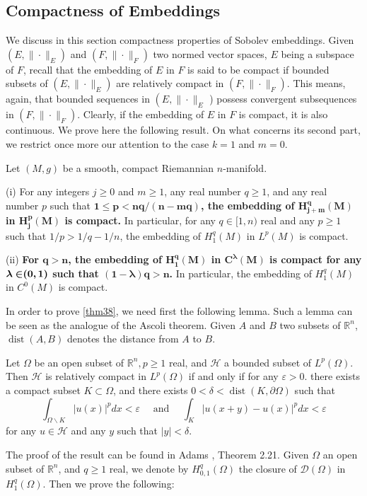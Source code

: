 \documentclass[12pt,hyperref,a4paper,UTF8]{ctexart}
\begin{document}
\subsection{Compactness of Embeddings}

We discuss in this section compactness properties of Sobolev embeddings. Given $\left(E,\|\cdot\|_E\right)$ and $\left(F,\|\cdot\|_F\right)$ two normed vector spaces, $E$ being a subspace of $F$, recall that the embedding of $E$ in $F$ is said to be compact if bounded subsets of $\left(E,\|\cdot\|_E\right)$ are relatively compact in $\left(F,\|\cdot\|_F\right)$. This means, again, that bounded sequences in $\left(E,\|\cdot\|_E\right.$ ) possess convergent subsequences in $\left(F,\|\cdot\|_F\right)$. Clearly, if the embedding of $E$ in $F$ is compact, it is also continuous. We prove here the following result. On what concerns its second part, we restrict once more our attention to the case $k=1$ and $m=0$.

\begin{Theorem}
    Let $(M, g)$ be a smooth, compact Riemannian ${n}$-manifold.
    
    \vskip 3pt
    \noindent
    (i) For any integers ${j \geq 0}$ and ${m \geq 1}$, any real number ${q \geq 1}$, and any real number ${p}$ such that \textbf{$\bm{1 \leq p<n q /(n-m q)}$, the embedding of $\bm{H_{j+m}^q(M)}$ in $\bm{H_j^p(M)}$ is compact.} In particular, for any ${q \in[1, n)}$ real and any ${p \geq 1}$ such that ${1 / p>1 / q-1 / n}$, the embedding of ${H_1^q(M)}$ in ${L^p(M)}$ is compact.
    
    \vskip 3pt
    \noindent
    (ii) \textbf{For $\bm{q>n}$, the embedding of $\bm{H_1^q(M)}$ in $\bm{C^\lambda(M)}$ is compact for any $\bm{\lambda \in$ $(0,1)}$ such that $\bm{(1-\lambda) q>n}$.} In particular, the embedding of ${H_1^q(M)}$ in ${C^0(M)}$ is compact.
\label{thm38}
\end{Theorem}
In order to prove \autoref{thm38}, we need first the following lemma. Such a lemma can be seen as the analogue of the Ascoli theorem. Given $A$ and $B$ two subsets of $\mathbb{R}^n$, $\operatorname{dist}(A, B)$ denotes the distance from $A$ to $B$.

\begin{Lemma}
Let $\Omega$ be an open subset of $\mathbb{R}^n, p \geq 1$ real, and $\mathcal{H}$ a bounded subset of $L^p(\Omega)$. Then $\mathcal{H}$ is relatively compact in $L^p(\Omega)$ if and only if for any $\varepsilon>0$. there exists a compact subset $K \subset \Omega$, and there exists $0<\delta<\operatorname{dist}(K, \partial \Omega)$ such that
$$
\int_{\Omega \backslash K}|u(x)|^p d x<\varepsilon \quad \text { and } \quad \int_K|u(x+y)-u(x)|^p d x<\varepsilon
$$
for any $u \in \mathcal{H}$ and any $y$ such that $|y|<\delta$.
\label{lem34}
\end{Lemma}
The proof of the result can be found in Adams \cite{A}, Theorem 2.21. 
Given $\Omega$ an open subset of $\mathbb{R}^n$, and $q \geq 1$ real, we denote by $H_{0,1}^q(\Omega)$ the closure of $\mathcal{D}(\Omega)$ in $H_1^q(\Omega)$. Then we prove the following:
\end{document}
